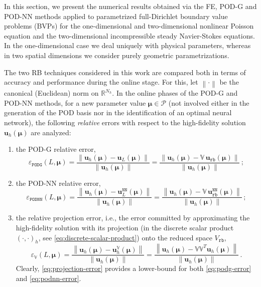 \documentclass[longtitle]{elsarticle}
\numberwithin{equation}{section}
\theoremstyle{theorem}
\theoremstyle{definition}
\theoremstyle{remark}
\theoremstyle{proposition}
\numberwithin{figure}{section}
\newcommand{\norm}[1]{\left\lVert#1\right\rVert}
\newcommand{\bg}[1]{\boldsymbol{#1}}
\begin{document}
		In this section, we present the numerical results obtained via the FE, POD-G and POD-NN methods applied to parametrized full-Dirichlet boundary value problems (BVPs) for the one-dimensional and two-dimensional nonlinear Poisson equation and the two-dimensional incompressible steady Navier-Stokes equations. In the one-dimensional case we deal uniquely with physical parameters, whereas in two spatial dimensions we consider purely geometric parametrizations. 	

		The two RB techniques considered in this work are compared both in terms of accuracy and performance during the online stage. For this, let $\norm{\cdot}$ be the canonical (Euclidean) norm on $\mathbb{R}^{N_h}$. In the online phases of the POD-G and POD-NN methods, for a new parameter value $\bg{\mu} \in \mathcal{P}$ (not involved either in the generation of the POD basis nor in the identification of an optimal neural network), the following \emph{relative} errors with respect to the high-fidelity solution $\mathbf{u}_h(\bg{\mu})$ are analyzed:
		\begin{enumerate}[label=(\alph*)]
			\item the POD-G relative error,
			\begin{equation}
				\label{eq:podg-error}
				\varepsilon_{\texttt{PODG}}^{}(L, \bg{\mu}) = \dfrac{\norm{\mathbf{u}_h(\bg{\mu}) - \mathbf{u}_L(\bg{\mu})}}{\norm{\mathbf{u}_h(\bg{\mu})}} = \dfrac{\norm{\mathbf{u}_h(\bg{\mu}) - \mathbb{V} \, \mathbf{u}_{\texttt{rb}}(\bg{\mu})}}{\norm{\mathbf{u}_h(\bg{\mu})}} \, ;
			\end{equation} 
			\item the POD-NN relative error,
			\begin{equation}
				\label{eq:podnn-error}
				\varepsilon_{\texttt{PODNN}}^{}(L, \bg{\mu}) = \dfrac{\norm{\mathbf{u}_h(\bg{\mu}) - \mathbf{u}_L^{\texttt{NN}}(\bg{\mu})}}{\norm{\mathbf{u}_h(\bg{\mu})}} = \dfrac{\norm{\mathbf{u}_h(\bg{\mu}) - \mathbb{V} \, \mathbf{u}_{\texttt{rb}}^{\texttt{NN}}(\bg{\mu})}}{\norm{\mathbf{u}_h(\bg{\mu})}} \, ;
			\end{equation} 
			\item the relative projection error, i.e., the error committed by approximating the high-fidelity solution with its projection (in the discrete scalar product $(\cdot,\cdot)_h$, see \eqref{eq:discrete-scalar-product}) onto the reduced space $V_{\texttt{rb}}$,
			\begin{equation}
				\label{eq:projection-error}
				\varepsilon_{\mathbb{V}}^{}(L, \bg{\mu}) = \dfrac{\norm{\mathbf{u}_h(\bg{\mu}) - \mathbf{u}_h^{\mathbb{V}}(\bg{\mu})}}{\norm{\mathbf{u}_h(\bg{\mu})}} = \dfrac{\norm{\mathbf{u}_h(\bg{\mu}) - \mathbb{V} \mathbb{V}^T \mathbf{u}_h(\bg{\mu})}}{\norm{\mathbf{u}_h(\bg{\mu})}} \, .
			\end{equation}
			Clearly, \eqref{eq:projection-error} provides a lower-bound for both \eqref{eq:podg-error} and \eqref{eq:podnn-error}.  
		\end{enumerate}
\end{document}
